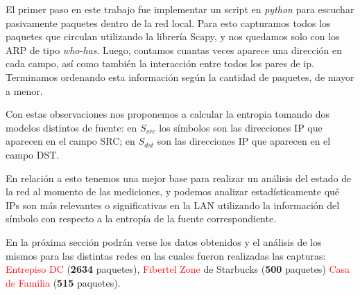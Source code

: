 El primer paso en este trabajo fue implementar un script en \emph{python} para escuchar pasivamente
paquetes dentro de la red local. Para esto capturamos todos los paquetes que circulan utilizando la 
librería Scapy, y nos quedamos solo con los ARP de tipo \emph{who-has}. Luego, contamos cuantas veces
aparece una direcci\'on en cada campo, as\'i como tambi\'en la interacci\'on entre todos los pares
de ip. Terminamos ordenando esta información según la cantidad de paquetes, de mayor a menor.


Con estas observaciones nos proponemos a calcular la entropia tomando dos modelos distintos de fuente:
en \textbf{$S_{src}$} los símbolos son las direcciones IP que aparecen en el campo SRC; en 
\textbf{$S_{dst}$} son las direcciones IP que aparecen en el campo DST.


En relación a esto tenemos una mejor base para realizar un análisis del estado de 
la red al momento de las mediciones, y podemos analizar estadísticamente qué IPs 
son más relevantes o significativas en la LAN utilizando la información del símbolo 
con respecto a la entropía de la fuente correspondiente.


En la próxima sección podrán verse los datos obtenidos y el análisis de los mismos
para las distintas redes en las cuales fueron realizadas las capturas: 
\textcolor{red}{Entrepiso DC} (\textbf{2634} paquetes), \textcolor{red}{Fibertel Zone} de Starbucks (\textbf{500} paquetes)
\textcolor{red}{Casa de Familia} (\textbf{515} paquetes).



